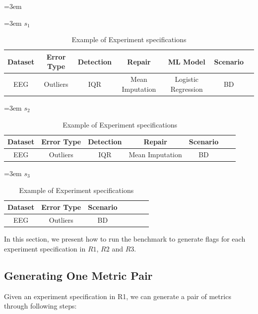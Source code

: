 \begin{table}[H]	
	\leftskip=3em
	\begin{flushleft}
		\leftskip=3em
		\textbf{$s_{1}$}
	\end{flushleft}
	\begin{tabular}{|c|c|c|c|c|c|c|}
		\hline 
		Dataset & Error Type & Detection & Repair & ML Model & Scenario \\ 
		\hline 
		EEG & Outliers & IQR & Mean Imputation & Logistic Regression & BD  \\ 
		\hline 
	\end{tabular} \linebreak	
	
	\begin{flushleft}
		\leftskip=3em
		\textbf{$s_{2}$}
	\end{flushleft}
	\begin{tabular}{|c|c|c|c|c|c|c|}
		\hline 
		Dataset & Error Type & Detection & Repair & Scenario \\ 
		\hline 
		EEG & Outliers & IQR & Mean Imputation & BD  \\
		\hline 
	\end{tabular} \linebreak
	
	\begin{flushleft}
		\leftskip=3em
		\textbf{$s_{3}$}
	\end{flushleft}	
	
	\begin{tabular}{|c|c|c|c|c|c|c|}
		\hline 
		Dataset & Error Type & Scenario \\ 
		\hline 
		EEG & Outliers & BD \\ 
		\hline 
	\end{tabular} \linebreak
	\caption{Example of Experiment specifications}
	\label{table:experiment-specifications}
\end{table}

In this section, we present how to run the benchmark to generate
flags for each experiment specification in $R1$, $R2$ and $R3$. 

\subsection{Generating One Metric Pair}

Given an experiment specification in R1, we can generate a pair
of metrics through following steps:

